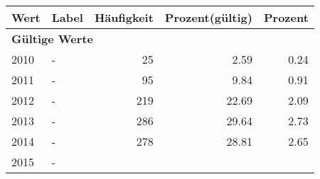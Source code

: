      \begin{longtable}{lXrrr}
     \toprule
     \textbf{Wert} & \textbf{Label} & \textbf{Häufigkeit} & \textbf{Prozent(gültig)} & \textbf{Prozent} \\
     \endhead
     \midrule
     \multicolumn{5}{l}{\textbf{Gültige Werte}}\\

     2010 &
     \multicolumn{1}{X}{ -  } &


       \num{25} &
       \num[round-mode=places,round-precision=2]{2.59} &
         \num[round-mode=places,round-precision=2]{0.24} \\

     2011 &
     \multicolumn{1}{X}{ -  } &


       \num{95} &
       \num[round-mode=places,round-precision=2]{9.84} &
         \num[round-mode=places,round-precision=2]{0.91} \\

     2012 &
     \multicolumn{1}{X}{ -  } &


       \num{219} &
       \num[round-mode=places,round-precision=2]{22.69} &
         \num[round-mode=places,round-precision=2]{2.09} \\

     2013 &
     \multicolumn{1}{X}{ -  } &


       \num{286} &
       \num[round-mode=places,round-precision=2]{29.64} &
         \num[round-mode=places,round-precision=2]{2.73} \\

     2014 &
     \multicolumn{1}{X}{ -  } &


       \num{278} &
       \num[round-mode=places,round-precision=2]{28.81} &
         \num[round-mode=places,round-precision=2]{2.65} \\

     2015 &
     \multicolumn{1}{X}{ -  } &



\end{longtable}
